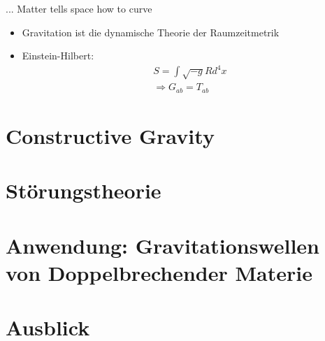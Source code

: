 \documentclass{beamer}
\begin{document}
    \begin{frame}{... Matter tells space how to curve}
        \begin{itemize}
            \item{Gravitation ist die dynamische Theorie der Raumzeitmetrik} \pause
            \item{Einstein-Hilbert:
                \begin{gather*}
                    S = \int \sqrt{-g} R d^4 x \\
                    \Rightarrow G_{ab} = T_{ab}
                \end{gather*}}
        \end{itemize}
    \end{frame}


    \section{Constructive Gravity}\label{sec:constructive-gravity}


    \section{Störungstheorie}\label{sec:stoerungstheorie}


    \section{Anwendung: Gravitationswellen von Doppelbrechender Materie}\label{sec:anwendung}


    \section{Ausblick}\label{sec:ausblick}
\end{document}
